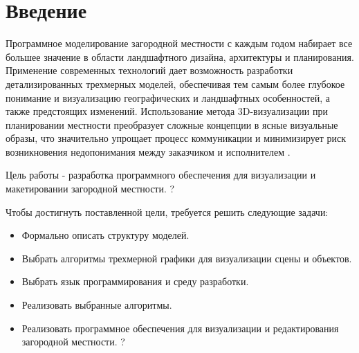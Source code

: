 \chapter*{Введение}

Программное моделирование загородной местности с каждым годом набирает все большее значение в области ландшафтного дизайна, архитектуры и планирования. Применение современных технологий дает возможность разработки детализированных трехмерных моделей, обеспечивая тем самым более глубокое понимание и визуализацию географических и ландшафтных особенностей, а также предстоящих изменений. Использование метода 3D-визуализации при планировании местности преобразует сложные концепции в ясные визуальные образы, что значительно упрощает процесс коммуникации и минимизирует риск возникновения недопонимания между заказчиком и исполнителем \cite{intro_visualization}.
 
 
Цель работы - разработка программного обеспечения для визуализации и макетировании загородной местности. ?

Чтобы достигнуть поставленной цели, требуется решить следующие задачи:
\begin{itemize}
    \item Формально описать структуру моделей.
    \item Выбрать алгоритмы трехмерной графики для визуализации сцены и объектов.
    \item Выбрать язык программирования и среду разработки.
    \item Реализовать выбранные алгоритмы.
    \item Реализовать программное обеспечения для визуализации и редактирования загородной местности. ?
\end{itemize}
